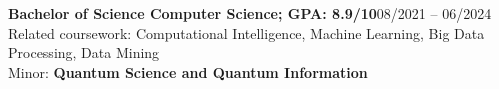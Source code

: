     {\textbf{Bachelor of Science Computer Science;  GPA: 8.9/10}}{08/2021 -- 06/2024}
    \small{Related coursework: Computational Intelligence, Machine Learning, Big Data Processing, Data Mining}\\
    
    \small{Minor: \textbf{Quantum Science and Quantum Information}}\\
